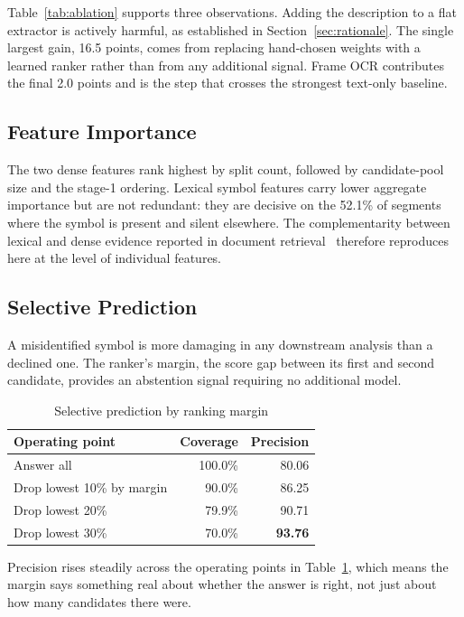 \documentclass[conference]{IEEEtran}
\begin{document}
Table~\ref{tab:ablation} supports three observations. Adding the description
to a flat extractor is actively harmful, as established in
Section~\ref{sec:rationale}. The single largest gain,
16.5 points, comes from replacing hand-chosen weights with a learned ranker
rather than from any additional signal. Frame OCR contributes the final 2.0
points and is the step that crosses the strongest text-only baseline.

\subsection{Feature Importance}

The two dense features rank highest by split count, followed by candidate-pool
size and the stage-1 ordering. Lexical symbol features carry lower aggregate
importance but are not redundant: they are decisive on the 52.1\% of segments
where the symbol is present and silent elsewhere. The complementarity between
lexical and dense evidence reported in document retrieval~\cite{luan} therefore
reproduces here at the level of individual features.

\subsection{Selective Prediction}

A misidentified symbol is more damaging in any downstream analysis than a
declined one. The ranker's margin, the score gap between its first and second
candidate, provides an abstention signal requiring no additional model.

\begin{table}[htbp]
\caption{Selective prediction by ranking margin}
\label{tab:abstain}
\centering
\begin{tabular}{lrr}
\toprule
Operating point & Coverage & Precision \\
\midrule
Answer all & 100.0\% & 80.06 \\
Drop lowest 10\% by margin & 90.0\% & 86.25 \\
Drop lowest 20\% & 79.9\% & 90.71 \\
Drop lowest 30\% & 70.0\% & \textbf{93.76} \\
\bottomrule
\end{tabular}
\end{table}

Precision rises steadily across the operating points in
Table~\ref{tab:abstain}, which means the margin says something real about
whether the answer is right, not just about how many candidates there were.
\end{document}
